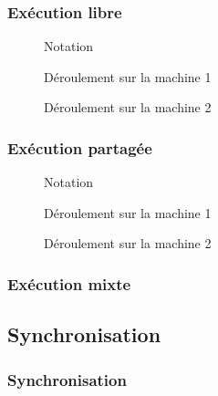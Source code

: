 \documentclass[draft,handout]{beamer}
\begin{document}
\begin{frame}
\frametitle{Exécution libre}
\begin{figure}
    \centering
    \begin{tikzpicture}
    
    \end{tikzpicture}
    \caption{Notation}
\end{figure}
\begin{figure}
    \centering
    \begin{tikzpicture}
    
    \end{tikzpicture}
    \caption{Déroulement sur la machine 1}
\end{figure}
\begin{figure}
    \centering
    \begin{tikzpicture}
    
    \end{tikzpicture}
    \caption{Déroulement sur la machine 2}
\end{figure}
\end{frame}
\begin{frame}
\frametitle{Exécution partagée}
\begin{figure}
    \centering
    \begin{tikzpicture}
    
    \end{tikzpicture}
    \caption{Notation}
\end{figure}
\begin{figure}
    \centering
    \begin{tikzpicture}
    
    \end{tikzpicture}
    \caption{Déroulement sur la machine 1}
\end{figure}
\begin{figure}
    \centering
    \begin{tikzpicture}
    
    \end{tikzpicture}
    \caption{Déroulement sur la machine 2}
\end{figure}
\end{frame}
\begin{frame}
\frametitle{Exécution mixte}
\end{frame}

\subsection{Synchronisation}
\begin{frame}
\frametitle{Synchronisation}
\end{frame}
\end{document}
